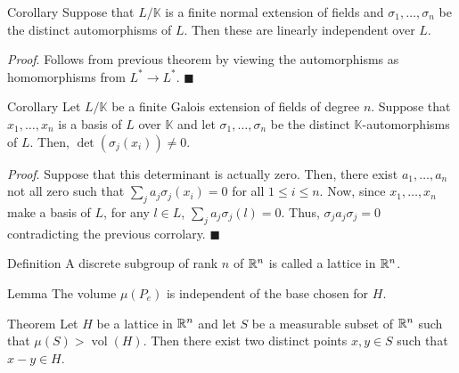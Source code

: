 \documentclass[9pt]{beamer}
\def\R{\ensuremath\mathbb{R}}
\begin{document}
\begin{frame}
  \begin{block}{Corollary}
    Suppose that $L/\mathbb{K}$ is a finite normal extension of fields and $\sigma_1,\ldots, \sigma_n$ be the distinct automorphisms of $L$. Then these are linearly independent over $L$.
  \end{block}

  \textit{Proof}. Follows from previous theorem by viewing the automorphisms as homomorphisms from $L^*\to L^*$. \hfill $\blacksquare$

  \begin{block}{Corollary}
    Let $L/\mathbb{K}$ be a finite Galois extension of fields of degree $n$. Suppose that $x_1,\ldots, x_n$ is a basis of $L$ over $\mathbb{K}$ and let $\sigma_1, \ldots, \sigma_n$ be the distinct $\mathbb{K}$-automorphisms of $L$. Then, $\det(\sigma_j(x_i)) \neq 0$.
  \end{block}
  \textit{Proof}. Suppose that this determinant is actually zero. Then, there exist $a_1,\ldots, a_n$ not all zero such that $\sum_{j}a_j\sigma_j(x_i) = 0$ for all $1\leq i\leq n$.
  Now, since $x_1,\ldots, x_n$ make a basis of $L$, for any $l\in L$, $\sum_{j}a_j \sigma_j(l) = 0$. Thus, $\sigma_j a_j \sigma_j = 0$ contradicting the previous corrolary. \hfill $\blacksquare$

\end{frame}

\begin{frame}
  \begin{block}{Definition}
    A discrete subgroup of rank $n$ of $\R^n$ is called a lattice in $\R^n$.
  \end{block}
\end{frame}

\begin{frame}
  \begin{block}{Lemma}
    The volume $\mu(P_e)$ is independent of the base chosen for $H$.
  \end{block}
\end{frame}

\begin{frame}
  \begin{block}{Theorem}
    Let $H$ be a lattice in $\R^n$ and let $S$ be a measurable subset of $\R^n$ such that $\mu(S)> \operatorname{vol}(H)$. Then there exist two distinct points $x,y\in S$ such that $x-y\in H$.
  \end{block}
\end{frame}
\end{document}
